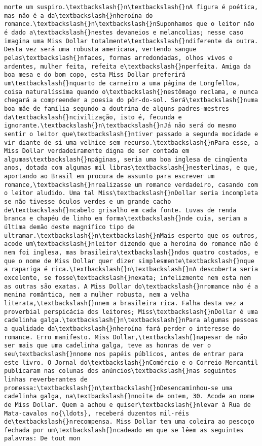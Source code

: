 \begin{Verbatim}[commandchars=\\\{\}]
morte um suspiro.\textbackslash{}n\textbackslash{}nA figura é poética, mas não é a da\textbackslash{}nheroína do romance.\textbackslash{}n\textbackslash{}nSuponhamos que o leitor não é dado a\textbackslash{}nestes devaneios e melancolias; nesse caso imagina uma Miss Dollar totalmente\textbackslash{}ndiferente da outra. Desta vez será uma robusta americana, vertendo sangue pelas\textbackslash{}nfaces, formas arredondadas, olhos vivos e ardentes, mulher feita, refeita e\textbackslash{}nperfeita. Amiga da boa mesa e do bom copo, esta Miss Dollar preferirá um\textbackslash{}nquarto de carneiro a uma página de Longfellow, coisa naturalíssima quando o\textbackslash{}nestômago reclama, e nunca chegará a compreender a poesia do pôr-do-sol. Será\textbackslash{}numa boa mãe de família segundo a doutrina de alguns padres-mestres da\textbackslash{}ncivilização, isto é, fecunda e ignorante.\textbackslash{}n\textbackslash{}nJá não será do mesmo sentir o leitor que\textbackslash{}ntiver passado a segunda mocidade e vir diante de si uma velhice sem recurso.\textbackslash{}nPara esse, a Miss Dollar verdadeiramente digna de ser contada em algumas\textbackslash{}npáginas, seria uma boa inglesa de cinqüenta anos, dotada com algumas mil libras\textbackslash{}nesterlinas, e que, aportando ao Brasil em procura de assunto para escrever um romance,\textbackslash{}nrealizasse um romance verdadeiro, casando com o leitor aludido. Uma tal Miss\textbackslash{}nDollar seria incompleta se não tivesse óculos verdes e um grande cacho de\textbackslash{}ncabelo grisalho em cada fonte. Luvas de renda branca e chapéu de linho em forma\textbackslash{}nde cuia, seriam a última demão deste magnífico tipo de ultramar.\textbackslash{}n\textbackslash{}nMais esperto que os outros, acode um\textbackslash{}nleitor dizendo que a heroína do romance não é nem foi inglesa, mas brasileira\textbackslash{}ndos quatro costados, e que o nome de Miss Dollar quer dizer simplesmente\textbackslash{}nque a rapariga é rica.\textbackslash{}n\textbackslash{}nA descoberta seria excelente, se fosse\textbackslash{}nexata; infelizmente nem esta nem as outras são exatas. A Miss Dollar do\textbackslash{}nromance não é a menina romântica, nem a mulher robusta, nem a velha literata,\textbackslash{}nnem a brasileira rica. Falha desta vez a proverbial perspicácia dos leitores; Miss\textbackslash{}nDollar é uma cadelinha galga.\textbackslash{}n\textbackslash{}nPara algumas pessoas a qualidade da\textbackslash{}nheroína fará perder o interesse do romance. Erro manifesto. Miss Dollar,\textbackslash{}napesar de não ser mais que uma cadelinha galga, teve as honras de ver o seu\textbackslash{}nnome nos papéis públicos, antes de entrar para este livro. O Jornal do\textbackslash{}nComércio e o Correio Mercantil publicaram nas colunas dos anúncios\textbackslash{}nas seguintes linhas reverberantes de promessa:\textbackslash{}n\textbackslash{}nDesencaminhou-se uma cadelinha galga, na\textbackslash{}nnoite de ontem, 30. Acode ao nome de Miss Dollar. Quem a achou e quiser\textbackslash{}nlevar à Rua de Mata-cavalos no{\ldots}, receberá duzentos mil-réis de\textbackslash{}nrecompensa. Miss Dollar tem uma coleira ao pescoço fechada por um\textbackslash{}ncadeado em que se lêem as seguintes palavras: De tout mon 
\end{Verbatim}

